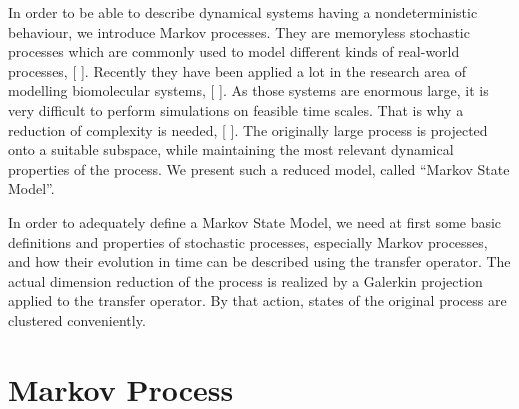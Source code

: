 In order to be able to describe dynamical systems having a nondeterministic behaviour, we introduce Markov processes.
They are memoryless stochastic processes which are commonly used to model different kinds of real-world processes, [ ].
Recently they have been applied a lot in the research area of modelling biomolecular systems, [ ].
As those systems are enormous large, it is very difficult to perform simulations on feasible time scales.
That is why a reduction of complexity is needed, [ ].
The originally large process is projected onto a suitable subspace, while maintaining the most relevant dynamical properties of the process. We present such a reduced model, called ``Markov State Model''.


In order to adequately define a Markov State Model, we need at first some basic definitions and properties of stochastic processes, especially Markov processes, and how their evolution in time can be described using the transfer operator. The actual dimension reduction of the process is realized by a Galerkin projection applied to the transfer operator. By that action, states of the original process are clustered conveniently.


\section{Markov Process}
\label{sec:markov}

